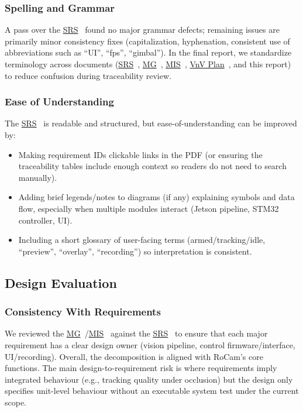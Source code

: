 \documentclass[12pt, titlepage]{article}
\newcommand{\SRS}{\href{../SRS/SRS.pdf}{SRS}}
\newcommand{\VnVPlan}{\href{../VnVPlan/VnVPlan.pdf}{VnV Plan}}
\newcommand{\MG}{\href{../Design/SoftArchitecture/MG.pdf}{MG}}
\newcommand{\MIS}{\href{../Design/SoftDetailedDes/MIS.pdf}{MIS}}
\begin{document}
\subsubsection{Spelling and Grammar}
A pass over the \SRS~\cite{SRS} found no major grammar defects; remaining
issues are primarily minor consistency fixes (capitalization, hyphenation,
consistent use of abbreviations such as ``UI'', ``fps'', ``gimbal''). In the
final report, we standardize terminology across documents (\SRS~\cite{SRS},
\MG~\cite{MG}, \MIS~\cite{MIS}, \VnVPlan~\cite{VnVPlan}, and this report) to
reduce confusion during traceability review.

\subsubsection{Ease of Understanding}
The \SRS~\cite{SRS} is readable and structured, but ease-of-understanding can
be improved by:
\begin{itemize}
  \item Making requirement IDs clickable links in the PDF (or ensuring the traceability
        tables include enough context so readers do not need to search manually).
  \item Adding brief legends/notes to diagrams (if any) explaining symbols and data
        flow, especially when multiple modules interact (Jetson pipeline, STM32
        controller, UI).
  \item Including a short glossary of user-facing terms (armed/tracking/idle,
        ``preview'', ``overlay'', ``recording'') so interpretation is consistent.
\end{itemize}

\subsection{Design Evaluation}

\subsubsection{Consistency With Requirements}
We reviewed the \MG~\cite{MG}/\MIS~\cite{MIS} against the \SRS~\cite{SRS} to
ensure that each major requirement has a clear design owner (vision pipeline,
control firmware/interface, UI/recording). Overall, the decomposition is
aligned with RoCam’s core functions. The main design-to-requirement risk is
where requirements imply integrated behaviour (e.g., tracking quality under
occlusion) but the design only specifies unit-level behaviour without an
executable system test under the current scope.
\end{document}
